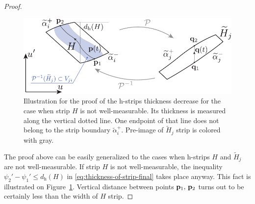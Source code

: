 \begin{proof}
	\begin{figure}[h]
	\centering
		\includegraphics[scale = 1]{pic/thickness of h-strip (b)}
		\caption{
			Illustration for the proof of the h-strips thickness decrease for the case when strip $H$ is not well-measurable.
			Its thickness is measured along the vertical dotted line.
			One endpoint of that line does not belong to the strip boundary $\widetilde{\alpha}_i^+$.
			Pre-image of $\widetilde{H}_j$ strip is colored with gray.
		}
	\label{fig:thickness-of-h-strip-b}
	\end{figure}
	
	The proof above can be easily generalized to the cases when h-strips  $H$ and $\widetilde{H}_j$ are not well-measurable.
	If strip $H$ is not well-measurable, the inequality $\psi_2' - \psi_1' \le d_{\mathrm{h}}(H)$ in \eqref{eq:thickness-of-strip-final} takes place anyway.
	This fact is illustrated on Figure~\ref{fig:thickness-of-h-strip-b}.
	Vertical distance between points $\vb{p}_1, \, \vb{p}_2$ turns out to be certainly less than the width of $H$ strip.
	

\end{proof}
